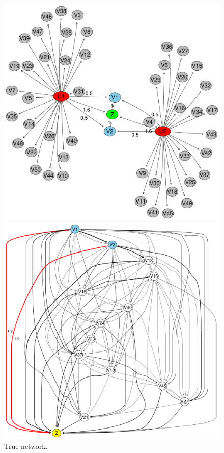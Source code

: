 \documentclass{article}
\begin{document}
\begin{figure}[ht!]
  \centering
  \begin{minipage}[t]{0.29\linewidth}
    \includegraphics[width=\linewidth]{./images/true_network.pdf}
    \caption{\label{fig_truenet}True network. }
  \end{minipage}\hfill
   \begin{minipage}[t]{0.33\linewidth}
     \includegraphics[width=\linewidth]{./images/estimated_network_missingdata.pdf}

\end{minipage}
\end{figure}
\end{document}
